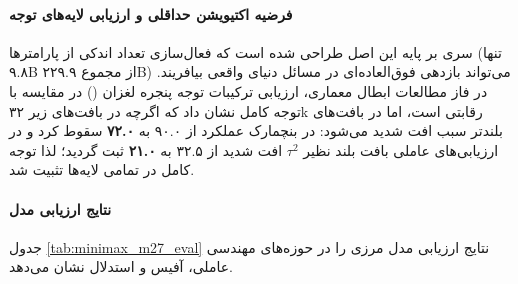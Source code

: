 \item {}

\paragraph*{فرضیه اکتیویشن حداقلی و ارزیابی لایه‌های توجه}
سری  \cite{minimaxm22026} بر پایه این اصل طراحی شده است که فعال‌سازی تعداد اندکی از پارامترها (تنها ۹.۸B از مجموع ۲۲۹.۹B) می‌تواند بازدهی فوق‌العاده‌ای در مسائل دنیای واقعی بیافریند. 
در فاز مطالعات ابطال معماری، ارزیابی ترکیبات توجه پنجره لغزان () در مقایسه با توجه کامل نشان داد که اگرچه  در بافت‌های زیر ۳۲k رقابتی است، اما در بافت‌های بلندتر سبب افت شدید می‌شود: در بنچمارک  عملکرد از ۹۰.۰ به \textbf{۷۲.۰} سقوط کرد و در ارزیابی‌های عاملی بافت بلند نظیر $\tau^2$ افت شدید از ۳۲.۵ به \textbf{۲۱.۰} ثبت گردید؛ لذا توجه کامل در تمامی لایه‌ها تثبیت شد.

\paragraph*{نتایج ارزیابی مدل }
جدول \ref{tab:minimax_m27_eval} نتایج ارزیابی مدل مرزی  را در حوزه‌های مهندسی عاملی، آفیس و استدلال نشان می‌دهد.

